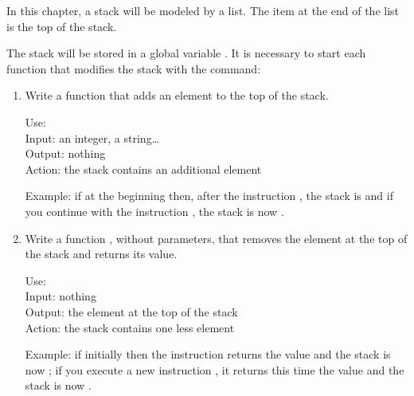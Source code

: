 \documentclass[11pt,class=report,crop=false]{standalone}
\begin{document}
\begin{activite}


In this chapter, a stack will be modeled by a list. The item at the end of the list is the top of the stack.


The stack will be stored in a global variable . 
It is necessary to start each function that modifies the stack with the command: 


\begin{enumerate}
  \item Write a function  that adds an element to the top of the stack.
  
  \begin{fonction}
  Use:  \\
  Input: an integer, a string\ldots \\
  Output: nothing \\
  Action: the stack contains an additional element
  
  \medskip
    
  Example: if at the beginning  then, after the instruction , the stack is \ci{[5,1,3,8]} and if you continue with the instruction
, the stack is now \ci{[5,1,3,8,6]}.     
  \end{fonction}

  \item Write a function , without parameters, that removes the element at the top of the stack and returns its value.
  
  \begin{fonction}
  Use:  \\
  Input: nothing \\
  Output: the element at the top of the stack \\
  Action: the stack contains one less element
  
  \medskip
    
  Example: if initially  then the instruction  returns the value  and the stack is now \ci{[13,4]}; if you execute a new instruction , it returns this time the value  and the stack is now \ci{[13]}.
  \end{fonction}
  

\end{enumerate}
\end{activite}
\end{document}
